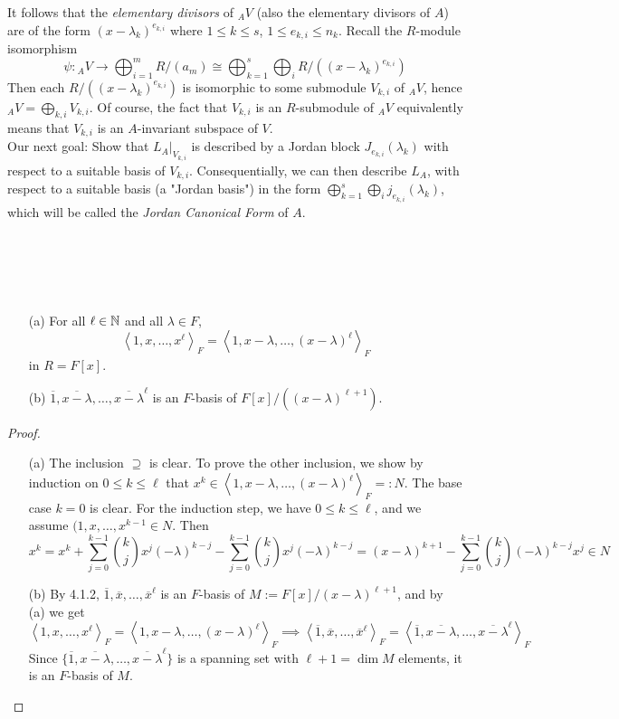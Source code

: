 \documentclass[11pt]{book}
\theoremstyle{definition}   \newtheorem{defn}[counter]{Definition} %
\newcommand{\ov}{\overline}   \newcommand{\wt}{\widetilde}
\newcommand{\gen}[1]{\left\langle #1 \right\rangle}   \newcommand{\stab}[2]{\tn{Stab}_{#1}(#2)}   \newcommand{\fix}[2]{\tn{Fix}_{#1}(#2)}   \newcommand{\op}{^{\tn{op}}}
\DeclareMathOperator{\ra}{\rightarrow}   \DeclareMathOperator{\Poly}{\mathbf{P}}   \DeclareMathOperator{\spn}{\textnormal{span}}   \DeclareMathOperator{\aut}{\textnormal{Aut}}
\newcommand{\vs}{\vspace{8pt}}   \newcommand{\hs}{\hspace{8pt}}
\numberwithin{counter}{chapter}
\begin{document}
It follows that the \emph{elementary divisors} of ${_AV}$ (also the elementary divisors of $A$) are of the form $(x-\lambda_k)^{e_{k,i}}$ where $1 \leq k \leq s$, $1 \leq e_{k,i} \leq n_k$. Recall the $R$-module isomorphism 
	\[\psi : {_AV} \ra \bigoplus_{i=1}^m R/(a_m) \cong \bigoplus_{k=1}^s \bigoplus_{i} R/((x-\lambda_k)^{e_{k,i}}) \]
Then each $R/((x-\lambda_k)^{e_{k,i}})$ is isomorphic to some submodule $V_{k,i}$ of ${_AV}$, hence ${_AV} = \bigoplus_{k,i} V_{k,i}$. Of course, the fact that $V_{k,i}$ is an $R$-submodule of ${_AV}$ equivalently means that $V_{k,i}$ is an $A$-invariant subspace of $V$. \\

Our next goal: Show that $L_A|_{V_{k,i}}$ is described by a Jordan block $J_{e_{k,i}}(\lambda_k)$ with respect to a suitable basis of $V_{k,i}$. Consequentially, we can then describe $L_A$, with respect to a suitable basis (a "Jordan basis") in the form $\bigoplus_{k=1}^s \bigoplus_i j_{e_{k,i}}(\lambda_k)$, which will be called the \emph{Jordan Canonical Form} of $A$. 

\vs \vs \ \\ \ \\

\begin{lemma}\ 
\begin{enumerate}
\item[(a)] For all $\ell \in \operatorname{\mathbb{N}}$ and all $\lambda \in F$, 
	\[\gen{1,x,\dots,x^\ell}_F = \gen{1,x-\lambda,\dots,(x-\lambda)^\ell}_F \]
in $R = F[x]$.
\item[(b)] $\ov{1},\ov{x-\lambda},\dots,\ov{x-\lambda}^\ell$ is an $F$-basis of $F[x]/((x-\lambda)^{\ell+1})$. 
\end{enumerate}
\end{lemma}

\begin{proof} \ 
\begin{enumerate}
\item[(a)] The inclusion $\supseteq$ is clear. To prove the other inclusion, we show by induction on $0 \leq k \leq \ell$ that $x^k \in \gen{1,x-\lambda,\dots,(x-\lambda)^\ell}_F =: N$. The base case $k = 0$ is clear. For the induction step, we have $0 \leq k \leq \ell$, and we assume $(1,x,\dots,x^{k-1} \in N$. Then
	\[x^{k} = x^{k} + \sum_{j=0}^{k-1} {k \choose j} x^j (-\lambda)^{k-j} - \sum_{j=0}^{k-1} {k \choose j} x^j (-\lambda)^{k-j} = (x-\lambda)^{k+1} - \sum_{j=0}^{k-1} {k \choose j}(-\lambda)^{k-j} x^j \in N \]

\item[(b)] By 4.1.2, $\ov{1},\ov{x},\dots,\ov{x}^\ell$ is an $F$-basis of $M := F[x]/(x-\lambda)^{\ell+1}$, and by (a) we get 
	\[\gen{1,x,\dots,x^\ell}_F = \gen{1,x-\lambda,\dots,(x-\lambda)^\ell}_F \implies \gen{\ov{1},\ov{x},\dots,\ov{x}^\ell}_F = \gen{\ov{1},\ov{x-\lambda},\dots,\ov{x-\lambda}^\ell}_F \]
Since $\{\ov{1},\ov{x-\lambda},\dots,\ov{x-\lambda}^\ell\}$ is a spanning set with $\ell+1 = \dim M$ elements, it is an $F$-basis of $M$. 
\end{enumerate}
\end{proof}
\end{document}

